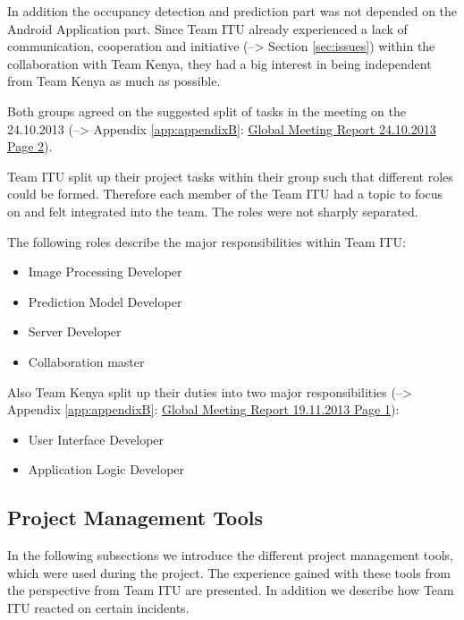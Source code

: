 In addition the occupancy detection and prediction part was not depended on the Android Application part. Since Team ITU already experienced a lack of communication, cooperation and initiative (--> Section \ref{sec:issues}) within the collaboration with Team Kenya, they had a big interest in being independent from Team Kenya as much as possible.

Both groups agreed on the suggested split of tasks in the meeting on the 24.10.2013 (--> Appendix \ref{app:appendixB}: \hyperlink{GSD20131024.2}{Global Meeting Report 24.10.2013 Page 2}).

Team ITU split up their project tasks within their group such that different roles could be formed. Therefore each member of the Team ITU had a topic to focus on and felt integrated into the team. The roles were not sharply separated.

The following roles describe the major responsibilities within Team ITU:
	\begin{itemize}
		\item Image Processing Developer
		\item Prediction Model Developer
		\item Server Developer
		\item Collaboration master
	\end{itemize}

Also Team Kenya split up their duties into two major responsibilities (--> Appendix \ref{app:appendixB}: \hyperlink{GSD20131119.1}{Global Meeting Report 19.11.2013 Page 1}):
	\begin{itemize}
		\item User Interface Developer
		\item Application Logic Developer
	\end{itemize}



\subsection{Project Management Tools}
\label{sec:tools}
In the following subsections we introduce the different project management tools, which were used during the project. The experience gained with these tools from the perspective from Team ITU are presented. In addition we describe how Team ITU reacted on certain incidents.


